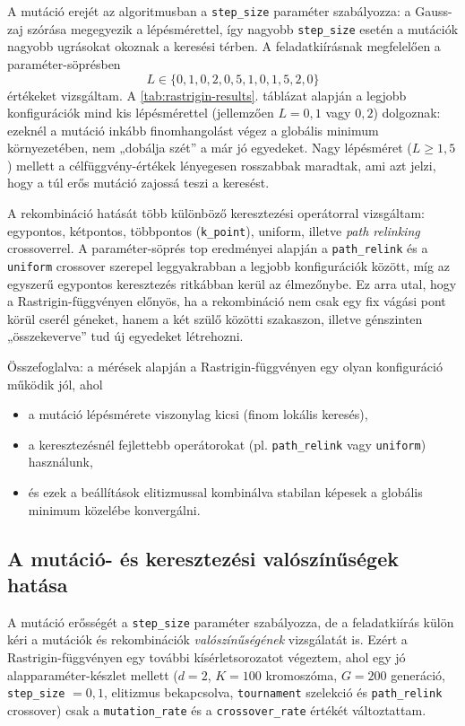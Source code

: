 \documentclass[a4paper,12pt]{article}
\begin{document}
A mutáció erejét az algoritmusban a \texttt{step\_size} paraméter szabályozza:
a Gauss-zaj szórása megegyezik a lépésmérettel, így nagyobb
\texttt{step\_size} esetén a mutációk nagyobb ugrásokat okoznak a
keresési térben. A feladatkiírásnak megfelelően a paraméter-söprésben
\[
  L \in \{0{,}1, 0{,}2, 0{,}5, 1{,}0, 1{,}5, 2{,}0\}
\]
értékeket vizsgáltam. A \ref{tab:rastrigin-results}. táblázat alapján
a legjobb konfigurációk mind kis lépésmérettel (jellemzően $L=0{,}1$
vagy $0{,}2$) dolgoznak: ezeknél a mutáció inkább finomhangolást végez
a globális minimum környezetében, nem „dobálja szét” a már jó
egyedeket. Nagy lépésméret ($L \ge 1{,}5$) mellett a célfüggvény-értékek
lényegesen rosszabbak maradtak, ami azt jelzi, hogy a túl erős
mutáció zajossá teszi a keresést.

A rekombináció hatását több különböző keresztezési operátorral
vizsgáltam: egypontos, kétpontos, többpontos (\texttt{k\_point}),
uniform, illetve \emph{path relinking} crossoverrel. A paraméter-söprés
top eredményei alapján a \texttt{path\_relink} és a \texttt{uniform}
crossover szerepel leggyakrabban a legjobb konfigurációk között, míg
az egyszerű egypontos keresztezés ritkábban kerül az élmezőnybe.
Ez arra utal, hogy a Rastrigin-függvényen előnyös, ha a rekombináció
nem csak egy fix vágási pont körül cserél géneket, hanem a két szülő
közötti szakaszon, illetve génszinten „összekeverve” tud új egyedeket
létrehozni.

Összefoglalva: a mérések alapján a Rastrigin-függvényen egy olyan
konfiguráció működik jól, ahol
\begin{itemize}
  \item a mutáció lépésmérete viszonylag kicsi (finom lokális keresés),
  \item a keresztezésnél fejlettebb operátorokat (pl. \texttt{path\_relink}
        vagy \texttt{uniform}) használunk,
  \item és ezek a beállítások elitizmussal kombinálva stabilan képesek
        a globális minimum közelébe konvergálni.
\end{itemize}



\subsection{A mutáció- és keresztezési valószínűségek hatása}

A mutáció erősségét a \texttt{step\_size} paraméter szabályozza, de a
feladatkiírás külön kéri a mutációk és rekombinációk \emph{valószínűségének}
vizsgálatát is. Ezért a Rastrigin-függvényen egy további kísérletsorozatot
végeztem, ahol egy jó alapparaméter-készlet mellett
($d=2$, $K=100$ kromoszóma, $G=200$ generáció,
\texttt{step\_size} $=0{,}1$, elitizmus bekapcsolva,
\texttt{tournament} szelekció és \texttt{path\_relink} crossover)
csak a \texttt{mutation\_rate} és a \texttt{crossover\_rate} értékét
változtattam.
\end{document}

